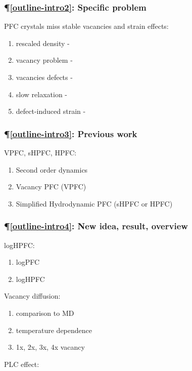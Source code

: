 \documentclass[%
 reprint,
 amsmath,amssymb,
 aps,
 prl,
]{revtex4-2}
\begin{document}
\subsubsection*{\P \ref{outline-intro2}: Specific problem}
PFC crystals miss stable vacancies and strain effects:
\begin{enumerate}
    \item rescaled density - 
    \item vacancy problem - 
    \item vacancies defects -
    \item slow relaxation - 
    \item defect-induced strain - 
\end{enumerate}

\subsubsection*{\P \ref{outline-intro3}: Previous work}
VPFC, sHPFC, HPFC:
\begin{enumerate}
    \item Second order dynamics
    \item Vacancy PFC (VPFC)
    \item Simplified Hydrodynamic PFC (sHPFC or HPFC)
\end{enumerate}

\subsubsection*{\P \ref{outline-intro4}: New idea, result, overview}
logHPFC:
\begin{enumerate}
    \item logPFC
    \item logHPFC
\end{enumerate}

Vacancy diffusion:
\begin{enumerate}
    \item comparison to MD
    \item temperature dependence
    \item 1x, 2x, 3x, 4x vacancy
\end{enumerate}

PLC effect:

\nocite{*}

\end{document}
